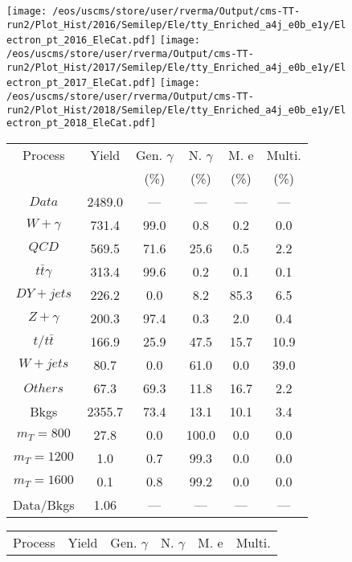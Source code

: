 \begin{figure}
\centering
\texttt{[image: /eos/uscms/store/user/rverma/Output/cms-TT-run2/Plot\_Hist/2016/Semilep/Ele/tty\_Enriched\_a4j\_e0b\_e1y/Electron\_pt\_2016\_EleCat.pdf]}
\texttt{[image: /eos/uscms/store/user/rverma/Output/cms-TT-run2/Plot\_Hist/2017/Semilep/Ele/tty\_Enriched\_a4j\_e0b\_e1y/Electron\_pt\_2017\_EleCat.pdf]}
\texttt{[image: /eos/uscms/store/user/rverma/Output/cms-TT-run2/Plot\_Hist/2018/Semilep/Ele/tty\_Enriched\_a4j\_e0b\_e1y/Electron\_pt\_2018\_EleCat.pdf]}
\begin{minipage}[c]{0.32\textwidth}
\centering
\tiny{
\begin{tabular}{cccccc}
\hline
Process & Yield & Gen. $\gamma$ & N. $\gamma$ & M. e & Multi. \\
 &  & (\%) & (\%) & (\%) & (\%)  \\
\hline
                                                                      $ Data $ &  2489.0 &  --- &  --- &  --- &  ---\\
$ W+\gamma $ &  731.4 &  99.0 &  0.8 &  0.2 &  0.0\\
$ QCD $ &  569.5 &  71.6 &  25.6 &  0.5 &  2.2\\
$ t\bar{t}\gamma $ &  313.4 &  99.6 &  0.2 &  0.1 &  0.1\\
$ DY+jets $ &  226.2 &  0.0 &  8.2 &  85.3 &  6.5\\
$ Z+\gamma $ &  200.3 &  97.4 &  0.3 &  2.0 &  0.4\\
$ t/t\bar{t} $ &  166.9 &  25.9 &  47.5 &  15.7 &  10.9\\
$ W+jets $ &  80.7 &  0.0 &  61.0 &  0.0 &  39.0\\
$ Others $ &  67.3 &  69.3 &  11.8 &  16.7 &  2.2\\
Bkgs &  2355.7 &  73.4 &  13.1 &  10.1 &  3.4\\
$ m_{T} = 800 $ &  27.8 &  0.0 &  100.0 &  0.0 &  0.0\\
$ m_{T} = 1200 $ &  1.0 &  0.7 &  99.3 &  0.0 &  0.0\\
$ m_{T} = 1600 $ &  0.1 &  0.8 &  99.2 &  0.0 &  0.0\\
Data/Bkgs &  1.06 &  --- &  --- &  --- &  ---\\
\hline
\end{tabular}
}
\end{minipage}
\begin{minipage}[c]{0.32\textwidth}
\centering
\tiny{
\begin{tabular}{cccccc}
\hline
Process & Yield & Gen. $\gamma$ & N. $\gamma$ & M. e & Multi. \\

\end{tabular}}
\end{minipage}
\end{figure}
